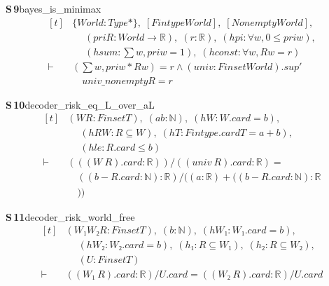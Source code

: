 \documentclass[conference]{IEEEtran}
\theoremstyle{definition}
\newcommand{\lean}[1]{\textsf{\footnotesize #1}}
\begin{document}
\noindent\textbf{S\,9}\quad\lean{bayes\_is\_minimax}
{\footnotesize\[ \begin{aligned}[t]
&\{ \mathit{World} : \mathit{Type}*\},\; [\mathit{Fintype} \mathit{World}],\; [\mathit{Nonempty} \mathit{World}],\\
&\quad \; (\mathit{pri} \mathit{R} : \mathit{World} \to \mathbb{R} ),\; (\mathit{r} : \mathbb{R} ),\; (\mathit{hpi} : \forall \mathit{w}, 0 \leq \mathit{pri} \mathit{w}),\\
&\quad \; (\mathit{hsum} : \textstyle\sum \mathit{w}, \mathit{pri} \mathit{w} = 1),\; (\mathit{hconst} : \forall \mathit{w}, \mathit{R} \mathit{w} = \mathit{r})\\
\vdash\;&(\textstyle\sum \mathit{w}, \mathit{pri} \mathit{w} * \mathit{R} \mathit{w}) = \mathit{r} \wedge (\mathit{univ} : \mathit{Finset} \mathit{World}).\mathit{sup'}\\
&\quad \mathit{univ\_nonempty} \mathit{R} = \mathit{r}
\end{aligned} \]}

\noindent\textbf{S\,10}\quad\lean{decoder\_risk\_eq\_L\_over\_aL}
{\footnotesize\[ \begin{aligned}[t]
&(\mathit{W} \mathit{R} : \mathit{Finset} \mathit{T}),\; (\mathit{a} \mathit{b} : \mathbb{N} ),\; (\mathit{hW} : \mathit{W}.\mathit{card} = \mathit{b}),\\
&\quad \; (\mathit{hRW} : \mathit{R} \subseteq \mathit{W}),\; (\mathit{hT} : \mathit{Fintype}.\mathit{card} \mathit{T} = \mathit{a} + \mathit{b}),\\
&\quad \; (\mathit{hle} : \mathit{R}.\mathit{card} \leq \mathit{b})\\
\vdash\;&(((\mathit{W} \ \mathit{R}).\mathit{card} : \mathbb{R} )) / ((\mathit{univ} \ \mathit{R}).\mathit{card} : \mathbb{R} ) =\\
&\quad ((\mathit{b} - \mathit{R}.\mathit{card} : \mathbb{N} ) : \mathbb{R} ) / ((\mathit{a} : \mathbb{R} ) + ((\mathit{b} - \mathit{R}.\mathit{card} : \mathbb{N} ) : \mathbb{R}\\
&\quad ))
\end{aligned} \]}

\noindent\textbf{S\,11}\quad\lean{decoder\_risk\_world\_free}
{\footnotesize\[ \begin{aligned}[t]
&(\mathit{W₁} \mathit{W₂} \mathit{R} : \mathit{Finset} \mathit{T}),\; (\mathit{b} : \mathbb{N} ),\; (\mathit{hW₁} : \mathit{W₁}.\mathit{card} = \mathit{b}),\\
&\quad \; (\mathit{hW₂} : \mathit{W₂}.\mathit{card} = \mathit{b}),\; (\mathit{h₁} : \mathit{R} \subseteq \mathit{W₁}),\; (\mathit{h₂} : \mathit{R} \subseteq \mathit{W₂}),\\
&\quad \; (\mathit{U} : \mathit{Finset} \mathit{T})\\
\vdash\;&((\mathit{W₁} \ \mathit{R}).\mathit{card} : \mathbb{R} ) / \mathit{U}.\mathit{card} = ((\mathit{W₂} \ \mathit{R}).\mathit{card} : \mathbb{R} ) / \mathit{U}.\mathit{card}
\end{aligned} \]}
\end{document}
